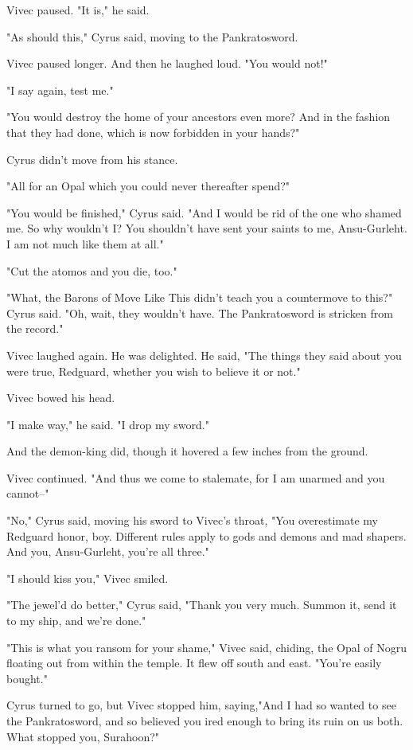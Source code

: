 Vivec paused. "It is," he said.

"As should this," Cyrus said, moving to the Pankratosword.

Vivec paused longer. And then he laughed loud. "You would not!"

"I say again, test me."

"You would destroy the home of your ancestors even more? And in the fashion that they had done, which is now forbidden in your hands?"

Cyrus didn't move from his stance.

"All for an Opal which you could never thereafter spend?"

"You would be finished," Cyrus said. "And I would be rid of the one who shamed me. So why wouldn't I? You shouldn't have sent your saints to me, Ansu-Gurleht. I am not much like them at all."

"Cut the atomos and you die, too."

"What, the Barons of Move Like This didn't teach you a countermove to this?" Cyrus said. "Oh, wait, they wouldn't have. The Pankratosword is stricken from the record."

Vivec laughed again. He was delighted. He said, "The things they said about you were true, Redguard, whether you wish to believe it or not."

Vivec bowed his head.

"I make way," he said. "I drop my sword."

And the demon-king did, though it hovered a few inches from the ground.

Vivec continued. "And thus we come to stalemate, for I am unarmed and you cannot--"

"No," Cyrus said, moving his sword to Vivec's throat, "You overestimate my Redguard honor, boy. Different rules apply to gods and demons and mad shapers. And you, Ansu-Gurleht, you're all three."

"I should kiss you," Vivec smiled.

"The jewel'd do better," Cyrus said, "Thank you very much. Summon it, send it to my ship, and we're done."

"This is what you ransom for your shame," Vivec said, chiding, the Opal of Nogru floating out from within the temple. It flew off south and east. "You're easily bought."

Cyrus turned to go, but Vivec stopped him, saying,"And I had so wanted to see the Pankratosword, and so believed you ired enough to bring its ruin on us both. What stopped you, Surahoon?"

